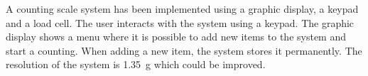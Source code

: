 A counting scale system has been implemented using a graphic display, a keypad and a load cell.
The user interacts with the system using a keypad. The graphic display shows a menu where it is possible to add new items to the system and start a counting. 
When adding a new item, the system stores it permanently.
The resolution of the system is \SI{1.35}{g} which could be improved.